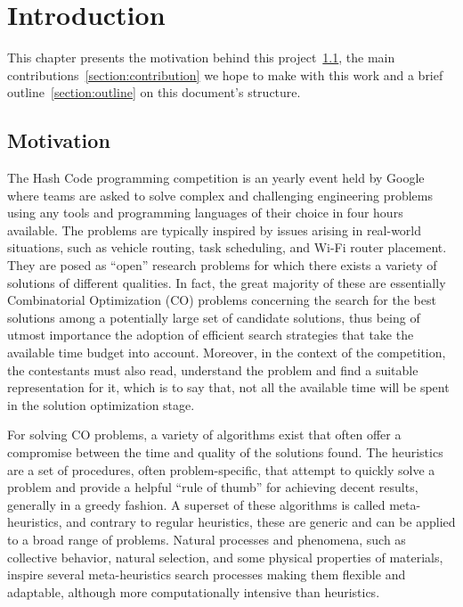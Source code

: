\chapter{Introduction} \label{chapter:introduction}

This chapter presents the motivation behind this
project~\ref{section:motivation}, the main
contributions~\ref{section:contribution} we hope to make with this work and a
brief outline~\ref{section:outline} on this document's structure.

\section{Motivation} \label{section:motivation}

The Hash Code programming competition is an yearly event held by Google where
teams are asked to solve complex and challenging engineering problems using any
tools and programming languages of their choice in four hours available.  The
problems are typically inspired by issues arising in real-world situations, such
as vehicle routing, task scheduling, and Wi-Fi router placement. They are posed
as ``open'' research problems for which there exists a variety of solutions of
different qualities. In fact, the great majority of these are essentially
Combinatorial Optimization (CO) problems concerning the search for the best
solutions among a potentially large set of candidate solutions, thus being of
utmost importance the adoption of efficient search strategies that take the
available time budget into account. Moreover, in the context of the competition,
the contestants must also read, understand the problem and find a suitable
representation for it, which is to say that, not all the available time will be
spent in the solution optimization stage.

For solving CO problems, a variety of algorithms exist that often offer a
compromise between the time and quality of the solutions found. The heuristics
are a set of procedures, often problem-specific, that attempt to quickly solve a
problem and provide a helpful ``rule of thumb'' for achieving decent results,
generally in a greedy fashion. A superset of these algorithms is called
meta-heuristics, and contrary to regular heuristics, these are generic and can
be applied to a broad range of problems. Natural processes and phenomena, such
as collective behavior, natural selection, and some physical properties of
materials, inspire several meta-heuristics search processes making them flexible
and adaptable, although more computationally intensive than heuristics.

